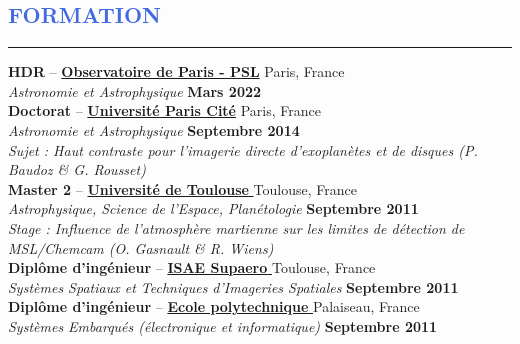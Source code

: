 \documentclass[11pt, a4paper, french]{article}
\begin{document}

\vspace{-0.43cm}
\textcolor{RoyalBlue}{\section{\large FORMATION}
\vspace{-0.2cm}\hrule}
\vspace{0.4cm}


{\bf HDR} -- \href{http://www.obspm.fr}{\textbf{Observatoire de Paris - PSL}}
\hfill Paris, France\\
{\small \it Astronomie et Astrophysique} \hfill  {\small \bf Mars 2022}\\

\vspace{-0.11cm}
{\bf Doctorat} -- \href{https://www.univ-paris-diderot.fr/}{\textbf{Université Paris Cité}}
\hfill Paris, France\\
{\small \it Astronomie et Astrophysique} \hfill  {\small \bf Septembre 2014}\\
{\footnotesize
\it Sujet : Haut contraste pour l'imagerie directe d'exoplanètes et de disques (P. Baudoz \& G. Rousset)}\\

\vspace{-0.11cm}
{\bf Master 2} --
\href{http://ezomp2.omp.obs-mip.fr/asep/index.php/fre}{\textbf{Université de Toulouse} }
 \hfill Toulouse, France\\
{\small \it Astrophysique, Science de l'Espace, Planétologie} \hfill { \small \bf Septembre 2011}\\
{\footnotesize
\it Stage : Influence de l'atmosphère martienne sur les limites de détection de MSL/Chemcam (O. Gasnault \& R. Wiens)}\\

\vspace{-0.11cm}
{\bf Diplôme d'ingénieur} -- \href{https://www.isae-supaero.fr/}{\textbf{\textbf{ISAE Supaero} }}  \hfill Toulouse, France\\
{\small \it Systèmes Spatiaux et Techniques d'Imageries Spatiales} \hfill { \small \bf Septembre 2011}\\


\vspace{-0.11cm}
{\bf Diplôme d'ingénieur} --
\href{http://www.polytechnique.edu/}{\textbf{\textbf{Ecole polytechnique} }}
\hfill Palaiseau, France  \\
{\small \it Systèmes Embarqués (électronique et informatique)}   \hfill {\small \bf Septembre 2011}\\
\end{document}
